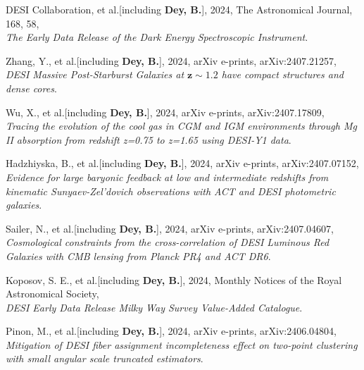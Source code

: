





\item DESI Collaboration, et al.[including \textbf{Dey, B.}], 2024, The Astronomical Journal, 168, 58, \\ \textit{The Early Data Release of the Dark Energy Spectroscopic Instrument}. 
 

\item Zhang, Y., et al.[including \textbf{Dey, B.}], 2024, arXiv e-prints, arXiv:2407.21257, \\ \textit{DESI Massive Post-Starburst Galaxies at $\mathbf{z\sim1.2}$ have compact structures and dense cores}. 
 

\item Wu, X., et al.[including \textbf{Dey, B.}], 2024, arXiv e-prints, arXiv:2407.17809, \\ \textit{Tracing the evolution of the cool gas in CGM and IGM environments through Mg II absorption from redshift z=0.75 to z=1.65 using DESI-Y1 data}. 
 

\item Hadzhiyska, B., et al.[including \textbf{Dey, B.}], 2024, arXiv e-prints, arXiv:2407.07152, \\ \textit{Evidence for large baryonic feedback at low and intermediate redshifts from kinematic Sunyaev-Zel'dovich observations with ACT and DESI photometric galaxies}. 
 

\item Sailer, N., et al.[including \textbf{Dey, B.}], 2024, arXiv e-prints, arXiv:2407.04607, \\ \textit{Cosmological constraints from the cross-correlation of DESI Luminous Red Galaxies with CMB lensing from Planck PR4 and ACT DR6}. 
 

\item Koposov, S. E., et al.[including \textbf{Dey, B.}], 2024, Monthly Notices of the Royal Astronomical Society, \\ \textit{DESI Early Data Release Milky Way Survey Value-Added Catalogue}. 
 

\item Pinon, M., et al.[including \textbf{Dey, B.}], 2024, arXiv e-prints, arXiv:2406.04804, \\ \textit{Mitigation of DESI fiber assignment incompleteness effect on two-point clustering with small angular scale truncated estimators}. 
 

